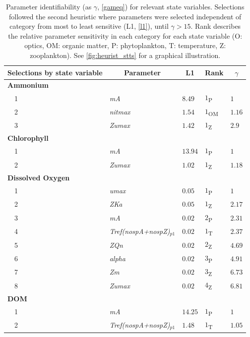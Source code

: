 \documentclass[letterpaper,12pt,oneside]{article}\usepackage[]{graphicx}\usepackage[]{color}
\begin{document}
\begin{table}[!tbp]
{\scriptsize
\caption{Parameter identifiability (as $\gamma$, \cref{gameq}) for relevant state variables.  Selections followed the second heuristic where parameters were selected independent of category from most to least sensitive (L1, \cref{l1}), until $\gamma > 15$.  Rank describes the relative parameter sensitivity in each category for each state variable (O: optics, OM: organic matter, P: phytoplankton, T: temperature, Z: zooplankton). See \cref{fig:heurist_stts} for a graphical illustration.\label{tab:heurist2}} 
\begin{center}
\begin{tabular}{lllll}
\hline\hline
\multicolumn{1}{l}{Selections by state variable}&\multicolumn{1}{c}{Parameter}&\multicolumn{1}{c}{L1}&\multicolumn{1}{c}{Rank}&\multicolumn{1}{c}{$\gamma$}\tabularnewline
\hline
{\bfseries Ammonium}&&&&\tabularnewline
~~1&\scriptsize{\textit{mA}}&$8.49$&$1$\textsubscript{P}&$1$\tabularnewline
~~2&\scriptsize{\textit{nitmax}}&$1.54$&$1$\textsubscript{OM}&$1.16$\tabularnewline
~~3&\scriptsize{\textit{Zumax}}&$1.42$&$1$\textsubscript{Z}&$2.9$\tabularnewline
\hline
{\bfseries Chlorophyll}&&&&\tabularnewline
~~1&\scriptsize{\textit{mA}}&$13.94$&$1$\textsubscript{P}&$1$\tabularnewline
~~2&\scriptsize{\textit{Zumax}}&$1.02$&$1$\textsubscript{Z}&$1.18$\tabularnewline
\hline
{\bfseries Dissolved Oxygen}&&&&\tabularnewline
~~1&\scriptsize{\textit{umax}}&$0.05$&$1$\textsubscript{P}&$1$\tabularnewline
~~2&\scriptsize{\textit{ZKa}}&$0.05$&$1$\textsubscript{Z}&$2.17$\tabularnewline
~~3&\scriptsize{\textit{mA}}&$0.02$&$2$\textsubscript{P}&$2.31$\tabularnewline
~~4&\scriptsize{\textit{Tref(nospA+nospZ)$_{p1}$}}&$0.02$&$1$\textsubscript{T}&$2.37$\tabularnewline
~~5&\scriptsize{\textit{ZQn}}&$0.02$&$2$\textsubscript{Z}&$4.69$\tabularnewline
~~6&\scriptsize{\textit{alpha}}&$0.02$&$3$\textsubscript{P}&$4.91$\tabularnewline
~~7&\scriptsize{\textit{Zm}}&$0.02$&$3$\textsubscript{Z}&$6.73$\tabularnewline
~~8&\scriptsize{\textit{Zumax}}&$0.02$&$4$\textsubscript{Z}&$6.81$\tabularnewline
\hline
{\bfseries DOM}&&&&\tabularnewline
~~1&\scriptsize{\textit{mA}}&$14.25$&$1$\textsubscript{P}&$1$\tabularnewline
~~2&\scriptsize{\textit{Tref(nospA+nospZ)$_{p1}$}}&$1.48$&$1$\textsubscript{T}&$1.05$\tabularnewline

\end{tabular}
\end{center}}
\end{table}
\end{document}
